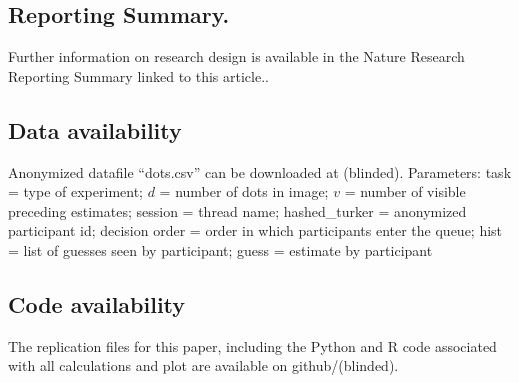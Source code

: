 \documentclass[9pt,a4paper,twocolumn,lineno]{article}
\begin{document}
\subsection*{Reporting Summary.}\footnotesize Further information on research design is available in the Nature Research Reporting Summary linked to this article..

\subsection*{Data availability}\footnotesize Anonymized datafile ``dots.csv'' can be downloaded at (blinded). Parameters: task = type of experiment; $d$ = number of dots in image; $v$ = number of visible preceding estimates; session = thread name; hashed\_turker = anonymized participant id; decision order = order in which participants enter the queue; hist = list of guesses seen by participant; guess = estimate by participant

\subsection*{Code availability}\footnotesize The replication files for this paper, including the Python and R code associated with all calculations and plot are available on github/(blinded).
\end{document}
